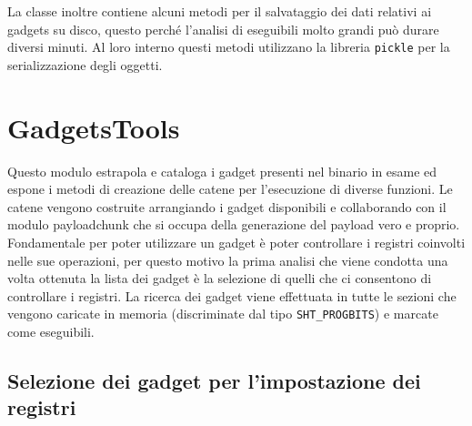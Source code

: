 La classe inoltre contiene alcuni metodi per il salvataggio dei dati
relativi ai gadgets su disco, questo perché l'analisi di eseguibili
molto grandi può durare diversi minuti. Al loro interno questi metodi
utilizzano la libreria \lstinline{pickle} per la serializzazione degli
oggetti.

\section{GadgetsTools}

Questo modulo estrapola e cataloga i gadget presenti nel binario in
esame ed espone i metodi di creazione delle catene per l'esecuzione di
diverse funzioni. Le catene vengono costruite arrangiando i gadget
disponibili e collaborando con il modulo payloadchunk che si occupa
della generazione del payload vero e proprio. Fondamentale per poter
utilizzare un gadget è poter controllare i registri coinvolti nelle
sue operazioni, per questo motivo la prima analisi che viene condotta
una volta ottenuta la lista dei gadget è la selezione di quelli che ci
consentono di controllare i registri. La ricerca dei gadget viene
effettuata in tutte le sezioni che vengono caricate in memoria
(discriminate dal tipo \lstinline{SHT_PROGBITS}) e marcate come
eseguibili.

\subsection{Selezione dei gadget per l'impostazione dei registri}


